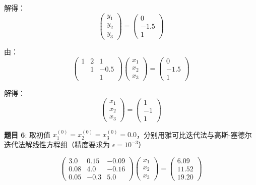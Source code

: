 \documentclass{article}
\begin{document}
解得：
$$
\begin{pmatrix}
    y_1 \\
    y_2 \\
    y_3
\end{pmatrix} 
= 
\begin{pmatrix}
    0 \\
    -1.5 \\
    1
\end{pmatrix}
$$

由：
$$
\begin{pmatrix}
    1 & 2 & 1 \\
      & 1 & -0.5 \\
      &   & 1
\end{pmatrix}
\begin{pmatrix}
    x_1 \\
    x_2 \\
    x_3 
\end{pmatrix}
=
\begin{pmatrix}
    0 \\
    -1.5 \\
    1
\end{pmatrix}
$$

解得：
$$
\begin{pmatrix}
    x_1 \\
    x_2 \\
    x_3
\end{pmatrix} 
= 
\begin{pmatrix}
    1 \\
    -1 \\
    1
\end{pmatrix}
$$

\noindent\textbf{题目 6}: 取初值 $x_1^{(0)} = x_2^{(0)} = x_3^{(0)} = 0.0$，分别用雅可比迭代法与高斯-塞德尔迭代法解线性方程组（精度要求为 $\epsilon=10^{-3}$）

$$
\begin{pmatrix}
    3.0 & 0.15 & -0.09 \\
    0.08 & 4.0 & -0.16 \\
    0.05 & -0.3 & 5.0
\end{pmatrix}
\begin{pmatrix}
    x_1 \\
    x_2 \\
    x_3
\end{pmatrix}
=
\begin{pmatrix}
    6.09 \\
    11.52 \\
    19.20
\end{pmatrix}
$$
\end{document}
